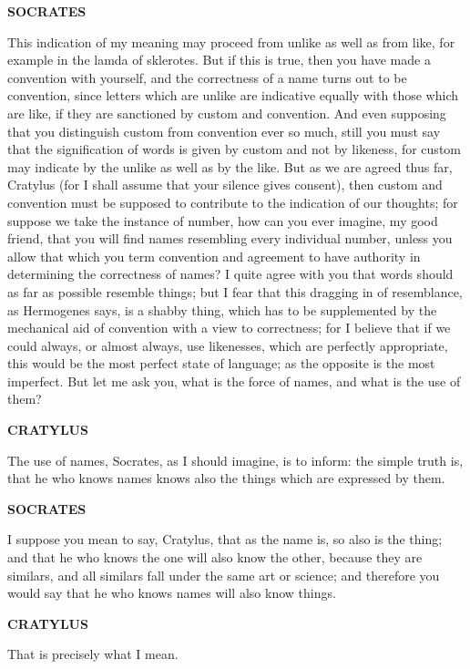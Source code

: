 \documentclass[11pt,letter]{article}
\begin{document}
\par \textbf{SOCRATES}
\par   This indication of my meaning may proceed from unlike as well as from like, for example in the lamda of sklerotes. But if this is true, then you have made a convention with yourself, and the correctness of a name turns out to be convention, since letters which are unlike are indicative equally with those which are like, if they are sanctioned by custom and convention. And even supposing that you distinguish custom from convention ever so much, still you must say that the signification of words is given by custom and not by likeness, for custom may indicate by the unlike as well as by the like. But as we are agreed thus far, Cratylus (for I shall assume that your silence gives consent), then custom and convention must be supposed to contribute to the indication of our thoughts; for suppose we take the instance of number, how can you ever imagine, my good friend, that you will find names resembling every individual number, unless you allow that which you term convention and agreement to have authority in determining the correctness of names? I quite agree with you that words should as far as possible resemble things; but I fear that this dragging in of resemblance, as Hermogenes says, is a shabby thing, which has to be supplemented by the mechanical aid of convention with a view to correctness; for I believe that if we could always, or almost always, use likenesses, which are perfectly appropriate, this would be the most perfect state of language; as the opposite is the most imperfect. But let me ask you, what is the force of names, and what is the use of them?

\par \textbf{CRATYLUS}
\par   The use of names, Socrates, as I should imagine, is to inform:  the simple truth is, that he who knows names knows also the things which are expressed by them.

\par \textbf{SOCRATES}
\par   I suppose you mean to say, Cratylus, that as the name is, so also is the thing; and that he who knows the one will also know the other, because they are similars, and all similars fall under the same art or science; and therefore you would say that he who knows names will also know things.

\par \textbf{CRATYLUS}
\par   That is precisely what I mean.
\end{document}
